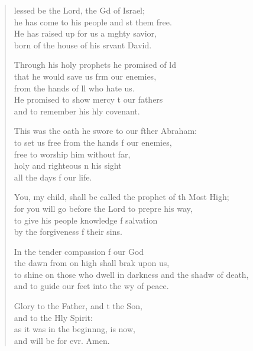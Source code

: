 \begin{verse}
  \begin{patverse}
lessed be the Lord, the Gd of Israel;\Med\\
he has come to his people and st them free.\\
He has raised up for us a m\pointup{\i}ghty savior,\Med\\
born of the house of his srvant David.

Through his holy prophets he promised of ld\Flex\\
that he would save us frm our enemies,\Med\\
from the hands of ll who hate us.\\
He promised to show mercy t our fathers\Med\\
and to remember his hly covenant.

This was the oath he swore to our fther Abraham:\Med\\
to set us free from the hands f our enemies,\\
free to worship him without far,\Flex\\
holy and righteous \pointup{\i}n his sight\Med\\
all the days f our life.

You, my child, shall be called the prophet of th Most High;\Med\\
for you will go before the Lord to prepre his way,\\
to give his people knowledge f salvation\Med\\
by the forgiveness f their sins.

In the tender compassion f our God\Med\\
the dawn from on high shall brak upon us,\\
to shine on those who dwell in darkness and the shadw of death,\Med\\
and to guide our feet into the wy of peace.

Glory to the Father, and t the Son,\Med\\
and to the Hly Spirit:\\
as it was in the beginn\pointup{\i}ng, is now,\Med\\
and will be for evr. Amen.
  \end{patverse}
  \end{verse}
